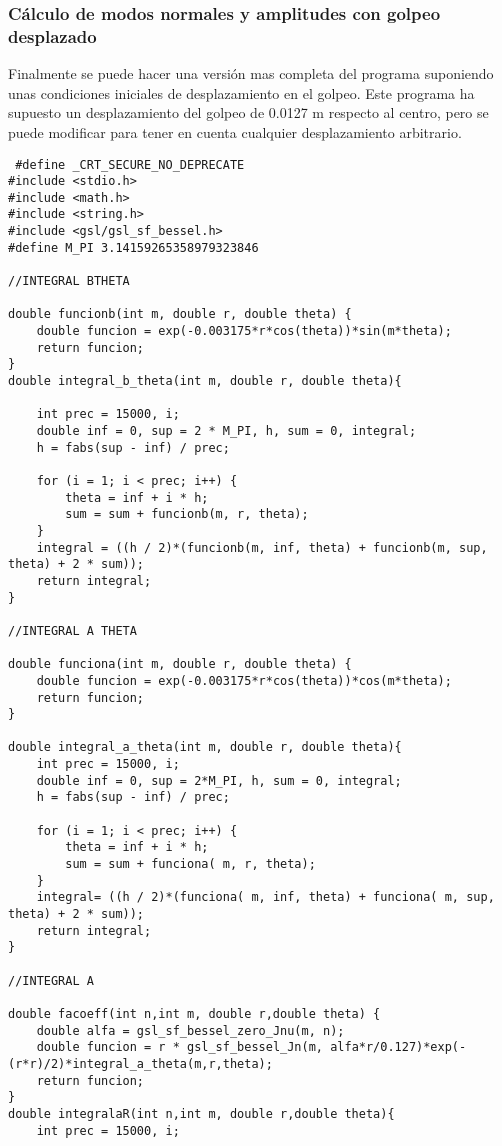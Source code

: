 \documentclass[journal, a4paper,onecolumn]{IEEEtran}
\begin{document}
\subsubsection{Cálculo de modos normales y amplitudes con golpeo desplazado}

 Finalmente se puede hacer una versión mas completa del programa suponiendo unas condiciones iniciales de desplazamiento en el golpeo. Este programa ha supuesto un desplazamiento del golpeo de 0.0127 m respecto al centro, pero se puede modificar para tener en cuenta cualquier desplazamiento arbitrario.
 
 \begin{lstlisting}
 #define _CRT_SECURE_NO_DEPRECATE
#include <stdio.h>
#include <math.h>
#include <string.h>
#include <gsl/gsl_sf_bessel.h>
#define M_PI 3.14159265358979323846

//INTEGRAL BTHETA

double funcionb(int m, double r, double theta) {
	double funcion = exp(-0.003175*r*cos(theta))*sin(m*theta);
	return funcion;
}
double integral_b_theta(int m, double r, double theta){

	int prec = 15000, i;
	double inf = 0, sup = 2 * M_PI, h, sum = 0, integral;
	h = fabs(sup - inf) / prec;

	for (i = 1; i < prec; i++) {
		theta = inf + i * h;
		sum = sum + funcionb(m, r, theta);
	}
	integral = ((h / 2)*(funcionb(m, inf, theta) + funcionb(m, sup, theta) + 2 * sum));
	return integral;
}

//INTEGRAL A THETA

double funciona(int m, double r, double theta) {
	double funcion = exp(-0.003175*r*cos(theta))*cos(m*theta);
	return funcion;
}

double integral_a_theta(int m, double r, double theta){
	int prec = 15000, i;
	double inf = 0, sup = 2*M_PI, h, sum = 0, integral;
	h = fabs(sup - inf) / prec;

	for (i = 1; i < prec; i++) {
		theta = inf + i * h;
		sum = sum + funciona( m, r, theta);
	}
	integral= ((h / 2)*(funciona( m, inf, theta) + funciona( m, sup, theta) + 2 * sum));
	return integral;
}

//INTEGRAL A

double facoeff(int n,int m, double r,double theta) {
	double alfa = gsl_sf_bessel_zero_Jnu(m, n);
	double funcion = r * gsl_sf_bessel_Jn(m, alfa*r/0.127)*exp(-(r*r)/2)*integral_a_theta(m,r,theta);
	return funcion;
}
double integralaR(int n,int m, double r,double theta){
	int prec = 15000, i;


\end{lstlisting}
\end{document}
